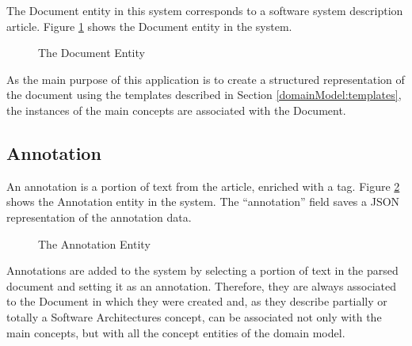 \documentclass[conference]{IEEEtran}
\begin{document}
The Document entity in this system corresponds to a software system description article. Figure \ref{figure:documentEntity} shows the Document entity in the system.
\begin{figure}[ht]
\centering
\renewcommand {\umltextcolor}{black}
\renewcommand {\umlfillcolor}{none}
\renewcommand {\umldrawcolor}{black}

\caption{The Document Entity}
\label{figure:documentEntity}
\end{figure}

As the main purpose of this application is to create a structured representation of the document using the templates described in Section \ref{domainModel:templates}, the instances of the main concepts are associated with the Document.  

\subsection{Annotation}
\label{architecture:annotation}

An annotation is a portion of text from the article, enriched with a tag. Figure \ref{figure:annotationEntity} shows the Annotation entity in the system. The ``annotation'' field saves a JSON representation of the annotation data.
\begin{figure}[ht]
\centering
\renewcommand {\umltextcolor}{black}
\renewcommand {\umlfillcolor}{none}
\renewcommand {\umldrawcolor}{black}

\caption{The Annotation Entity}
\label{figure:annotationEntity}
\end{figure}
Annotations are added to the system by selecting a portion of text in the parsed document and setting it as an annotation. Therefore, they are always associated to the Document in which they were created and, as they describe partially or totally a Software Architectures concept, can be associated not only with the main concepts, but with all the concept entities of the domain model. 
\end{document}
